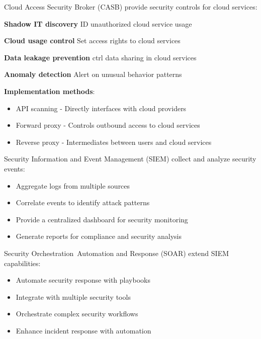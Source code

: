 \multend


\begin{concept}{Cloud Access Security Broker (CASB)}
provide security controls for cloud services:

\textbf{Shadow IT discovery} ID unauthorized cloud service usage

\textbf{Cloud usage control} Set access rights to cloud services

\textbf{Data leakage prevention} ctrl data sharing in cloud services

\textbf{Anomaly detection} Alert on unusual behavior patterns

\textbf{Implementation methods}:
    \begin{itemize}
        \item API scanning - Directly interfaces with cloud providers
        \item Forward proxy - Controls outbound access to cloud services
        \item Reverse proxy - Intermediates between users and cloud services
    \end{itemize}
\end{concept}






\begin{concept}{Security Information and Event Management (SIEM)}
 collect and analyze security events:
\begin{itemize}
    \item Aggregate logs from multiple sources
    \item Correlate events to identify attack patterns
    \item Provide a centralized dashboard for security monitoring
    \item Generate reports for compliance and security analysis
\end{itemize}
\end{concept}

\begin{concept}{Security Orchestration\, Automation and Response (SOAR)}
extend SIEM capabilities:
\begin{itemize}
    \item Automate security response with playbooks
    \item Integrate with multiple security tools
    \item Orchestrate complex security workflows
    \item Enhance incident response with automation
\end{itemize}
\end{concept}

